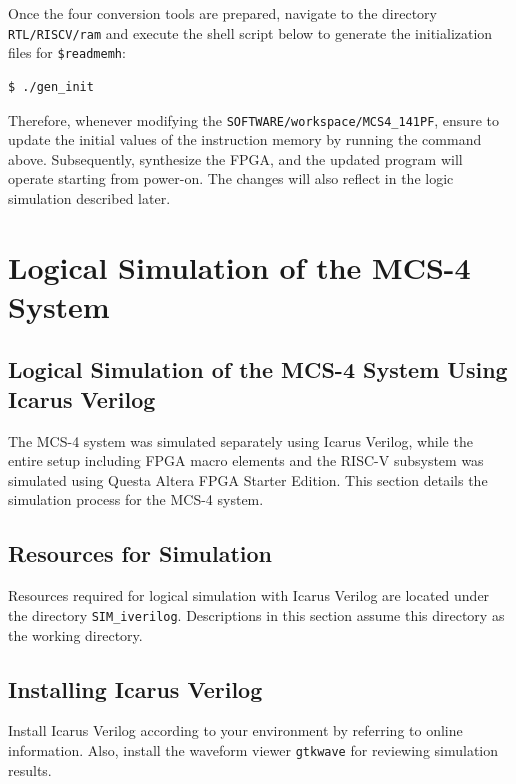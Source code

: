 Once the four conversion tools are prepared, navigate to the directory \texttt{RTL/RISCV/ram} and execute the shell script below to generate the initialization files for \verb|$readmemh|:

\begin{verbatim}
$ ./gen_init
\end{verbatim}

Therefore, whenever modifying the \texttt{SOFTWARE/workspace/MCS4\_141PF}, ensure to update the initial values of the instruction memory by running the command above. Subsequently, synthesize the FPGA, and the updated program will operate starting from power-on. The changes will also reflect in the logic simulation described later.

\section{Logical Simulation of the MCS-4 System}
\subsection{Logical Simulation of the MCS-4 System Using Icarus Verilog}
The MCS-4 system was simulated separately using Icarus Verilog, while the entire setup including FPGA macro elements and the RISC-V subsystem was simulated using Questa Altera FPGA Starter Edition. This section details the simulation process for the MCS-4 system.

\subsection{Resources for Simulation}
Resources required for logical simulation with Icarus Verilog are located under the directory \texttt{SIM\_iverilog}. Descriptions in this section assume this directory as the working directory.

\subsection{Installing Icarus Verilog}
Install Icarus Verilog according to your environment by referring to online information. Also, install the waveform viewer \texttt{gtkwave} for reviewing simulation results.

